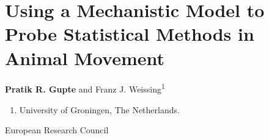 
%
\chapter{Using a Mechanistic Model to Probe Statistical Methods in Animal Movement}\label{ch:patternprocess}

{\noindent \textbf{Pratik R. Gupte} and Franz J. Weissing\textsuperscript{1}}

    \medskip

    {\color{Maroon}\normalsize{}}
    
    \begin{enumerate}
        \item University of Groningen, The Netherlands.
    \end{enumerate}
    
    \medskip

    {\color{Maroon}\normalsize{}}

    European Research Council

\clearpage
